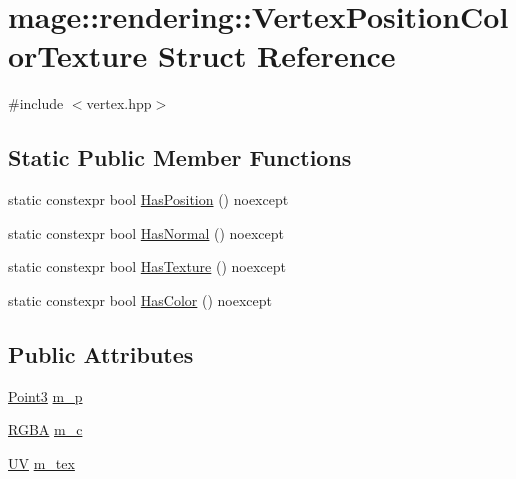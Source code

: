 \hypertarget{structmage_1_1rendering_1_1_vertex_position_color_texture}{}\section{mage\+:\+:rendering\+:\+:Vertex\+Position\+Color\+Texture Struct Reference}
\label{structmage_1_1rendering_1_1_vertex_position_color_texture}


{\ttfamily \#include $<$vertex.\+hpp$>$}

\subsection*{Static Public Member Functions}
\begin{DoxyCompactItemize}
\item 
static constexpr bool \mbox{\hyperlink{structmage_1_1rendering_1_1_vertex_position_color_texture_a7e63de3d06cc4d0a9fb3f32cde764c9c}{Has\+Position}} () noexcept
\item 
static constexpr bool \mbox{\hyperlink{structmage_1_1rendering_1_1_vertex_position_color_texture_a3823f3163d8350e4c448e99e90cc9436}{Has\+Normal}} () noexcept
\item 
static constexpr bool \mbox{\hyperlink{structmage_1_1rendering_1_1_vertex_position_color_texture_a679323396203b9b47a6ef4c936c72d58}{Has\+Texture}} () noexcept
\item 
static constexpr bool \mbox{\hyperlink{structmage_1_1rendering_1_1_vertex_position_color_texture_a1d3db6f6fb5a93ce596e7157fc204f81}{Has\+Color}} () noexcept
\end{DoxyCompactItemize}
\subsection*{Public Attributes}
\begin{DoxyCompactItemize}
\item 
\mbox{\hyperlink{structmage_1_1_point3}{Point3}} \mbox{\hyperlink{structmage_1_1rendering_1_1_vertex_position_color_texture_a924a25377182f6c29ff7f50fba08113c}{m\+\_\+p}}
\item 
\mbox{\hyperlink{structmage_1_1_r_g_b_a}{R\+G\+BA}} \mbox{\hyperlink{structmage_1_1rendering_1_1_vertex_position_color_texture_acf8f36b78e8366edff1b476e2e97fec5}{m\+\_\+c}}
\item 
\mbox{\hyperlink{structmage_1_1_u_v}{UV}} \mbox{\hyperlink{structmage_1_1rendering_1_1_vertex_position_color_texture_a48cb88cc9c5d68350249e192152a7104}{m\+\_\+tex}}
\end{DoxyCompactItemize}
